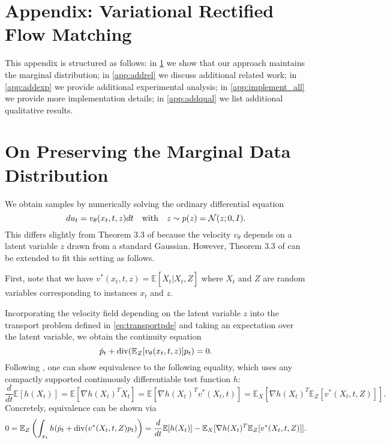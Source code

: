 \section*{Appendix: Variational Rectified Flow Matching}

This appendix is structured as follows: 
in \cref{app:preserve_marginal} we show that our approach maintains the marginal distribution; 
in \cref{app:addrel} we discuss additional related work;
in \cref{app:addexp} we provide additional experimental analysis;
in \cref{app:implement_all} we provide more implementation details; 
in \cref{app:addqual} we list additional qualitative results.

\section{On Preserving the Marginal Data Distribution}
\label{app:preserve_marginal}
We obtain samples by numerically solving the ordinary differential equation
$$
du_t = v_\theta(x_t,t,z)dt \quad\text{with}\quad z\sim p(z) = {\cal N}(z;0,I).
$$
This differs slightly from Theorem 3.3 of \citet{liu2023flow} because the velocity $v_\theta$ depends on a latent variable $z$ drawn from a standard Gaussian. 
However, Theorem 3.3 of \citet{liu2023flow} can be extended to fit this setting as follows.

First, note that we have $v^\ast(x_t,t,z) = \mathbb{E}[\dot X_t|X_t,Z]$ where $X_t$ and $Z$ are random variables corresponding to instances $x_t$ and $z$.

Incorporating the velocity field depending on the latent variable $z$ into the transport problem defined in \cref{eq:transportpde} and taking an expectation over the latent variable, we obtain the continuity equation
\begin{equation}
    \dot p_t + \operatorname{div} (\mathbb{E}_Z[v_\theta(x_t,t,z)]p_t) = 0.
    \label{eq:app:cont}
\end{equation}
Following \citet{liu2023flow}, one can show equivalence to the following equality, which uses any compactly supported continuously differentiable test function $h$:
$$
\frac{d}{dt}\mathbb{E}[h(X_t)] = \mathbb{E}[\nabla h(X_t)^T \dot X_t] = \mathbb{E}[\nabla h(X_t)^T v^\ast(X_t,t)] = \mathbb{E}_X[\nabla h(X_t)^T \mathbb{E}_Z[v^\ast(X_t,t,Z)]].
$$
Concretely, equivalence can be shown via
$$
0 = \mathbb{E}_Z\left(\int_{x_t}h(\dot p_t + \operatorname{div} (v^\ast(X_t,t,Z)p_t)\right) = \frac{d}{dt}\mathbb{E}[h(X_t)] - \mathbb{E}_X[\nabla h(X_t)^T \mathbb{E}_Z[v^\ast(X_t,t,Z)]].
$$

